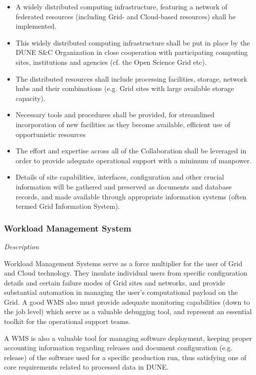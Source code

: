 \begin{itemize}
	\item A widely distributed computing infrastructure, featuring a network of federated resources (including Grid- and Cloud-based resources) shall be implemented.
	
	\item This widely distributed computing infrastructure shall be put in place by the DUNE S\&C Organization in close cooperation with participating computing sites, institutions and agencies (cf. the Open Science Grid etc).

	
	\item The distributed resources shall include processing facilities, storage, network hubs and their combinations (e.g. Grid sites with large available storage capacity).
	
	\item Necessary tools and procedures shall be provided, for streamlined incorporation of new facilities as they become available, efficient use of opportunistic resources 
	
	\item The effort and expertise across all of the Collaboration shall be leveraged in order to provide adequate operational support with a minimum of manpower.
	
	\item Details of site capabilities, interfaces, configuration and other crucial information will be gathered and preserved as documents and database records, and made available through appropriate information systems (often termed Grid Information System).
\end{itemize}

\subsubsection{Workload Management System}
\textit{Description}

Workload Management Systems serve as a force multiplier for the user of Grid and Cloud technology. They insulate individual users from specific configuration details and certain failure modes of Grid sites and networks, and provide substantial automation in managing the user's computational payload on the Grid. A good WMS also must provide adequate monitoring capabilities (down to the job level) which serve as a valuable debugging tool, and represent an essential toolkit for the operational support teams.

A WMS is also a valuable tool for managing software deployment, keeping proper accounting information regarding releases and document configuration (e.g. release) of the software used for a specific production run, thus satisfying one of core requirements related to processed data in DUNE.

